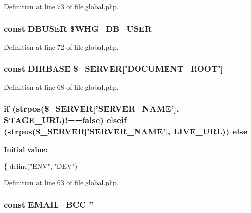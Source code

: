 Definition at line 73 of file global.\-php.

\hypertarget{global_8php_a221f39b0b526c043e3a1ade2dd56a70e}{
\subsubsection[{D\-B\-U\-S\-E\-R}]{\setlength{\rightskip}{0pt plus 5cm}const D\-B\-U\-S\-E\-R \$W\-H\-G\-\_\-\-D\-B\-\_\-\-U\-S\-E\-R}}\label{global_8php_a221f39b0b526c043e3a1ade2dd56a70e}


Definition at line 72 of file global.\-php.

\hypertarget{global_8php_a504552fd43e46a0032aa3f2895349f22}{
\subsubsection[{D\-I\-R\-B\-A\-S\-E}]{\setlength{\rightskip}{0pt plus 5cm}const D\-I\-R\-B\-A\-S\-E \$\-\_\-\-S\-E\-R\-V\-E\-R\mbox{[}'D\-O\-C\-U\-M\-E\-N\-T\-\_\-\-R\-O\-O\-T'\mbox{]}}}\label{global_8php_a504552fd43e46a0032aa3f2895349f22}


Definition at line 68 of file global.\-php.

\hypertarget{global_8php_a44a5a7f896e2444d9c7b91deffff3b49}{
\subsubsection[{else}]{\setlength{\rightskip}{0pt plus 5cm}if (strpos(\$\-\_\-\-S\-E\-R\-V\-E\-R\mbox{[}'S\-E\-R\-V\-E\-R\-\_\-\-N\-A\-M\-E'\mbox{]}, {\bf S\-T\-A\-G\-E\-\_\-\-U\-R\-L})!==false) elseif (strpos(\$\-\_\-\-S\-E\-R\-V\-E\-R\mbox{[}'S\-E\-R\-V\-E\-R\-\_\-\-N\-A\-M\-E'\mbox{]}, {\bf L\-I\-V\-E\-\_\-\-U\-R\-L})) else}}\label{global_8php_a44a5a7f896e2444d9c7b91deffff3b49}
{\bfseries Initial value\-:}
\begin{DoxyCode}
\{
                              define(\textcolor{stringliteral}{"ENV"}, \textcolor{stringliteral}{"DEV"})
\end{DoxyCode}


Definition at line 63 of file global.\-php.

\hypertarget{global_8php_ae82459bfcf33ac1be174bfe1237a545d}{
\subsubsection[{E\-M\-A\-I\-L\-\_\-\-B\-C\-C}]{\setlength{\rightskip}{0pt plus 5cm}const E\-M\-A\-I\-L\-\_\-\-B\-C\-C ''}}\label{global_8php_ae82459bfcf33ac1be174bfe1237a545d}


